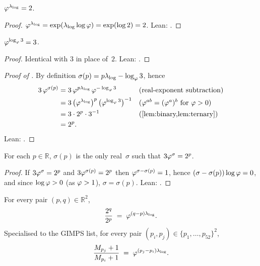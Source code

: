 \begin{Lemma}\label{lem:binary}
$\varphi^{\lambda_{\log}} = 2$.
\end{Lemma}

\begin{proof}
$\varphi^{\lambda_{\log}}=\exp(\lambda_{\log}\log\varphi)=\exp(\log 2)=2$.
Lean: .
\end{proof}

\begin{Lemma}\label{lem:ternary}
$\varphi^{\log_{\varphi} 3} = 3$.
\end{Lemma}

\begin{proof}
Identical with $3$ in place of~$2$.  Lean: .
\end{proof}

\begin{proof}[Proof of ]
By definition $\sigma(p)=p\lambda_{\log}-\log_{\varphi}3$, hence
\begin{align*}
  3\,\golden^{\sigma(p)}
  &= 3\,\golden^{p\lambda_{\log}}\,\golden^{-\log_{\golden}3}
  &&\text{(real-exponent subtraction)}\\
  &= 3\,\bigl(\golden^{\lambda_{\log}}\bigr)^{p}\,
       \bigl(\golden^{\log_{\golden}3}\bigr)^{-1}
  &&\text{($\golden^{ab}=(\golden^{a})^{b}$ for $\golden>0$)}\\
  &= 3\cdot 2^{p}\cdot 3^{-1}
  &&\text{(\Cref{lem:binary,lem:ternary})}\\
  &= 2^{p}. \qedhere
\end{align*}
Lean: .
\end{proof}

\begin{Theorem}\label{thm:unique}
For each $p\in\mathbb{R}$, $\sigma(p)$ is the only real~$\sigma$ such that
$3\varphi^{\sigma}=2^{p}$.
\end{Theorem}

\begin{proof}
If $3\varphi^{\sigma}=2^{p}$ and $3\varphi^{\sigma(p)}=2^{p}$ then
$\varphi^{\sigma-\sigma(p)}=1$, hence
$(\sigma-\sigma(p))\log\varphi=0$, and since $\log\varphi>0$ (as
$\varphi>1$), $\sigma=\sigma(p)$.  Lean:
.
\end{proof}

\begin{Theorem}\label{thm:ratio-main}
For every pair $(p,q)\in\mathbb{R}^{2}$,
\[
  \frac{2^{q}}{2^{p}} \;=\; \varphi^{(q-p)\lambda_{\log}}.
\]
Specialised to the GIMPS list, for every pair
$(p_{i},p_{j})\in\{p_{1},\ldots,p_{52}\}^{2}$,
\[
  \frac{M_{p_{j}}+1}{M_{p_{i}}+1} \;=\; \varphi^{(p_{j}-p_{i})\lambda_{\log}}.
\]
\end{Theorem}

